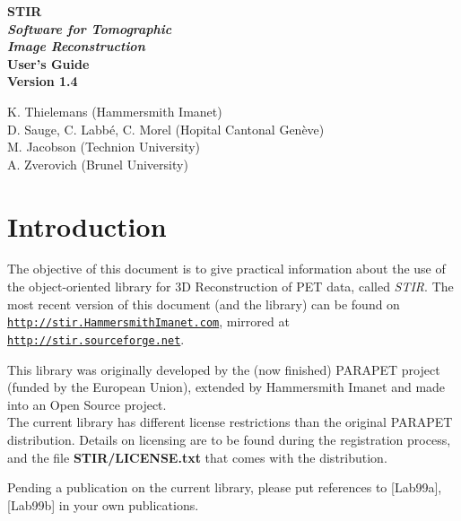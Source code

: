 \documentclass{article}
\def\R2Lurl#1#2{\mbox{\href{#1}{\tt #2}}}
\begin{document}
\begin{spacing}{2}
\begin{center}

\textbf{
{\Huge  STIR} 
\huge
\\[1cm]
\textit{ Software for  Tomographic \\ Image Reconstruction}
}
\\[3cm]

\textbf{{\huge User's Guide\\
 Version 1.4}}
\end{center}

\end{spacing}

\large 

\noindent 
K. Thielemans (Hammersmith Imanet)\\
D. Sauge, C. Labb\'e, C. Morel (Hopital Cantonal Gen\`eve)\\
M. Jacobson (Technion University)\\
A. Zverovich (Brunel University)



\newpage

\tableofcontents


\section{
Introduction}

The objective of this document is to give practical information 
about the use of the object-oriented library for 3D Reconstruction 
of PET data, called \textit{STIR}. The most recent version of this 
document (and the library) can be found on \\
\R2Lurl{http://stir.HammersmithImanet.com}{http://stir.HammersmithImanet.com}, 
mirrored at\\
\R2Lurl{http://stir.sourceforge.net}{http://stir.sourceforge.net}.


This library was originally developed by the (now finished) PARAPET 
project (funded by the European Union), extended by Hammersmith 
Imanet and made into an Open Source project. \\
The current library has different license restrictions than the 
original PARAPET distribution. Details on licensing are to be 
found during the registration process, and the file \textbf{STIR/LICENSE.txt} 
that comes with the distribution. 


Pending a publication on the current library, please put references 
to [Lab99a], [Lab99b] in your own publications.
\end{document}
